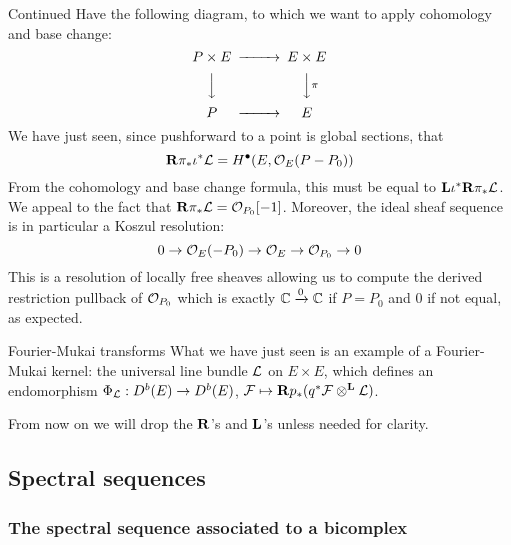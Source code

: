 \begin{example}{Continued}{}
Have the following diagram, to which we want to apply cohomology and base change:
\begin{equation*}
    \begin{CD}
        P\times E @>>> E\times E \\
          @VVV @VV\pi V \\
        P @>>> E
    \end{CD}
\end{equation*}
We have just seen, since pushforward to a point is global sections, that
\begin{equation*}
    \mathbf{R}\pi_*\iota^*\mathcal{L} = H^\bullet(E,\mathcal{O}_E(P-P_0))
\end{equation*}
From the cohomology and base change formula, this must be equal to $\mathbf{L}\iota^*\mathbf{R}\pi_*\mathcal{L}$. We appeal to the fact that $\mathbf{R}\pi_*\mathcal{L}=\mathcal{O}_{P_0}[-1]$. Moreover, the ideal sheaf sequence is in particular a Koszul resolution:
\begin{equation*}
    0\to\mathcal{O}_E(-P_0)\to\mathcal{O}_E\to\mathcal{O}_{P_0}\to 0
\end{equation*}
This is a resolution of locally free sheaves allowing us to compute the derived restriction pullback of $\mathcal{O}_{P_0}$ which is exactly $\mathbb{C}\xrightarrow{0}\mathbb{C}$ if $P=P_0$ and $0$ if not equal, as expected.


\end{example}

\begin{remark}{Fourier-Mukai transforms}{}
    What we have just seen is an example of a Fourier-Mukai kernel: the universal line bundle $\mathcal{L}$ on $E\times E$, which defines an endomorphism $\Phi_{\mathcal{L}}:D^b(E)\to D^b(E)$, $\mathcal{F}\mapsto\mathbf{R} p_*(q^*\mathcal{F}\otimes^{\mathbf{L}}\mathcal{L})$.
\end{remark}

From now on we will drop the $\mathbf{R}$'s and $\mathbf{L}$'s unless needed for clarity.

\subsection{Spectral sequences}

\subsubsection{The spectral sequence associated to a bicomplex}


